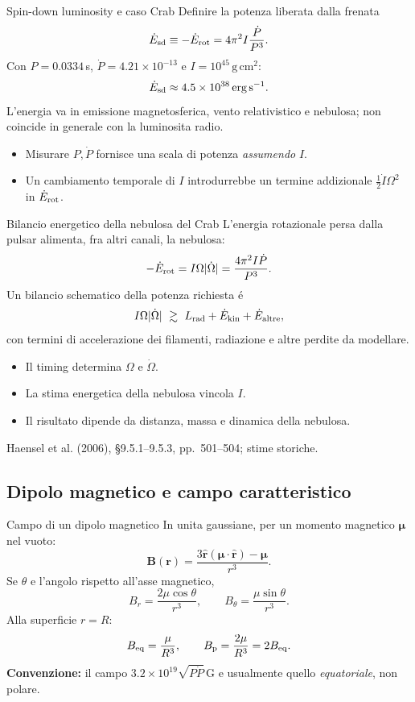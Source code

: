 \begin{frame}[t]{Spin-down luminosity e caso Crab}
\small
Definire la potenza liberata dalla frenata
\[
\dot E_{\rm sd}\equiv-\dot E_{\rm rot}
=4\pi^2I\frac{\dot P}{P^3}.
\]
Con $P=0.0334\,$s, $\dot P=4.21\times10^{-13}$ e $I=10^{45}\,\mathrm{g\,cm^2}$:
\[
\dot E_{\rm sd}\approx4.5\times10^{38}\,\mathrm{erg\,s^{-1}}.
\]
L'energia va in emissione magnetosferica, vento relativistico e nebulosa; non coincide in generale con la luminosita radio.
\begin{itemize}
\item Misurare $P,\dot P$ fornisce una scala di potenza \emph{assumendo} $I$.
\item Un cambiamento temporale di $I$ introdurrebbe un termine addizionale $\tfrac12\dot I\Omega^2$ in $\dot E_{\rm rot}$.
\end{itemize}
\end{frame}


\begin{frame}[t]{Bilancio energetico della nebulosa del Crab}
\small
L'energia rotazionale persa dalla pulsar alimenta, fra altri canali, la nebulosa:
\[
-\dot E_{\rm rot}=I\Omega|\dot\Omega|
=\frac{4\pi^2I\dot P}{P^3}.
\]
Un bilancio schematico della potenza richiesta \'e
\[
I\Omega|\dot\Omega|\ \gtrsim\ L_{\rm rad}+\dot E_{\rm kin}+\dot E_{\rm altre},
\]
con termini di accelerazione dei filamenti, radiazione e altre perdite da modellare.
\begin{itemize}
\item Il timing determina $\Omega$ e $\dot\Omega$.
\item La stima energetica della nebulosa vincola $I$.
\item Il risultato dipende da distanza, massa e dinamica della nebulosa.
\end{itemize}
\footnotesize Haensel et al. (2006), \S9.5.1--9.5.3, pp.~501--504; stime storiche.
\end{frame}

\subsection{Dipolo magnetico e campo caratteristico}

\begin{frame}[t]{Campo di un dipolo magnetico}
\small
In unita gaussiane, per un momento magnetico $\boldsymbol\mu$ nel vuoto:
\[
\mathbf B(\mathbf r)=\frac{3\hat{\mathbf r}
(\boldsymbol\mu\cdot\hat{\mathbf r})-\boldsymbol\mu}{r^3}.
\]
Se $\theta$ e l'angolo rispetto all'asse magnetico,
\[
B_r=\frac{2\mu\cos\theta}{r^3},\qquad
B_\theta=\frac{\mu\sin\theta}{r^3}.
\]
Alla superficie $r=R$:
\[
B_{\rm eq}=\frac\mu{R^3},\qquad B_{\rm p}=\frac{2\mu}{R^3}=2B_{\rm eq}.
\]
\textbf{Convenzione:} il campo $3.2\times10^{19}\sqrt{P\dot P}\,$G e usualmente quello \emph{equatoriale}, non polare.
\end{frame}


